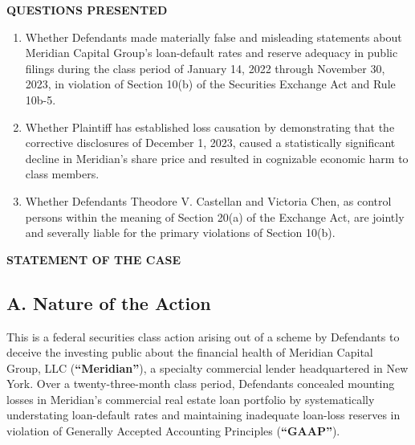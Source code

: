 \documentclass[12pt,letterpaper]{article}
\newcommand{\dterm}[1]{\textbf{``#1''}}
\begin{document}
{}
\begin{center}
  {\large\bfseries\color{accent}QUESTIONS PRESENTED}
\end{center}

\begin{enumerate}[label=\textbf{\arabic*.},leftmargin=2em,itemsep=6pt,parsep=0pt]

\item Whether Defendants made materially false and misleading statements about
  Meridian Capital Group's loan-default rates and reserve adequacy in public
  filings during the class period of January 14, 2022 through November 30, 2023,
  in violation of Section 10(b) of the Securities Exchange Act and Rule 10b-5.

\item Whether Plaintiff has established loss causation by demonstrating that the
  corrective disclosures of December 1, 2023, caused a statistically significant
  decline in Meridian's share price and resulted in cognizable economic harm to
  class members.

\item Whether Defendants Theodore V. Castellan and Victoria Chen, as control
  persons within the meaning of Section 20(a) of the Exchange Act, are jointly
  and severally liable for the primary violations of Section 10(b).

\end{enumerate}

{}
\begin{center}
  {\large\bfseries\color{accent}STATEMENT OF THE CASE}
\end{center}

\subsection*{A. Nature of the Action}

This is a federal securities class action arising out of a scheme by Defendants to deceive the investing public about the financial health of Meridian Capital Group, LLC (\dterm{Meridian}), a specialty commercial lender headquartered in New York. Over a twenty-three-month class period, Defendants concealed mounting losses in Meridian's commercial real estate loan portfolio by systematically understating loan-default rates and maintaining inadequate loan-loss reserves in violation of Generally Accepted Accounting Principles (\dterm{GAAP}).
\end{document}
